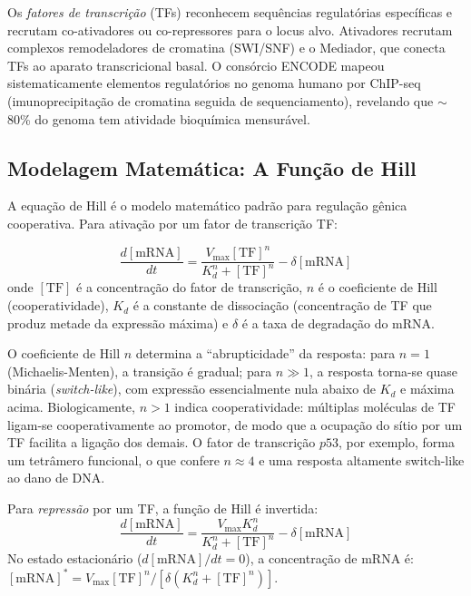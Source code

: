 Os \emph{fatores de transcrição} (TFs) reconhecem sequências regulatórias específicas e
recrutam co-ativadores ou co-repressores para o locus alvo. Ativadores recrutam complexos
remodeladores de cromatina (SWI/SNF) e o Mediador, que conecta TFs ao aparato
transcricional basal. O consórcio ENCODE mapeou sistematicamente elementos regulatórios
no genoma humano por ChIP-seq (imunoprecipitação de cromatina seguida de sequenciamento),
revelando que $\sim$80\% do genoma tem atividade bioquímica mensurável.

\subsection{Modelagem Matemática: A Função de Hill}

A equação de Hill é o modelo matemático padrão para regulação gênica cooperativa. Para
ativação por um fator de transcrição TF:

\begin{equation}
\frac{d[\text{mRNA}]}{dt} = \frac{V_{\max} [\text{TF}]^n}{K_d^n + [\text{TF}]^n} - \delta [\text{mRNA}]
\end{equation}
onde $[\text{TF}]$ é a concentração do fator de transcrição, $n$ é o coeficiente de Hill
(cooperatividade), $K_d$ é a constante de dissociação (concentração de TF que produz
metade da expressão máxima) e $\delta$ é a taxa de degradação do mRNA.

O coeficiente de Hill $n$ determina a ``abrupticidade'' da resposta: para $n = 1$
(Michaelis-Menten), a transição é gradual; para $n \gg 1$, a resposta torna-se quase
binária (\textit{switch-like}), com expressão essencialmente nula abaixo de $K_d$ e máxima
acima. Biologicamente, $n > 1$ indica cooperatividade: múltiplas moléculas de TF ligam-se
cooperativamente ao promotor, de modo que a ocupação do sítio por um TF facilita a ligação
dos demais. O fator de transcrição $p53$, por exemplo, forma um tetrâmero funcional, o que
confere $n \approx 4$ e uma resposta altamente switch-like ao dano de DNA.

Para \emph{repressão} por um TF, a função de Hill é invertida:
\begin{equation}
\frac{d[\text{mRNA}]}{dt} = \frac{V_{\max} K_d^n}{K_d^n + [\text{TF}]^n} - \delta [\text{mRNA}]
\end{equation}
No estado estacionário ($d[\text{mRNA}]/dt = 0$), a concentração de mRNA é:
$[\text{mRNA}]^* = V_{\max} [\text{TF}]^n / [\delta(K_d^n + [\text{TF}]^n)]$.

